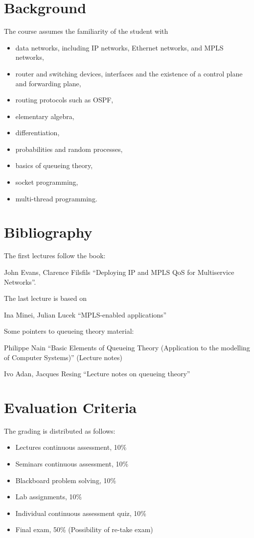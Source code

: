 \section{Background}
The course assumes the familiarity of the student with 
\begin{itemize}
\item data networks, including IP networks, Ethernet networks,  and MPLS networks,
\item router and switching devices, interfaces and the existence of a control plane and forwarding plane,
\item routing protocols such as OSPF,
\item elementary algebra,
\item differentiation,
\item probabilities and random processes, 
\item basics of queueing theory,
\item socket programming,
\item multi-thread programming.
\end{itemize}


\section{Bibliography}

The first lectures follow the book:

John Evans, Clarence Filsfils ``Deploying IP and MPLS QoS for Multiservice Networks''.

The last lecture is based on 

Ina Minei, Julian Lucek ``MPLS-enabled applications''

Some pointers to queueing theory material:

Philippe Nain ``Basic Elements of Queueing Theory (Application to the modelling of Computer Systems)'' (Lecture notes)


Ivo Adan, Jacques Resing ``Lecture notes on queueing theory''



\section{Evaluation Criteria}

The grading is distributed as follows:
\begin{itemize}
\item Lectures continuous assessment, 10\%
\item Seminars continuous assessment, 10\%
\item Blackboard problem solving, 10\%
\item Lab assignments, 10\%
\item Individual continuous assessment quiz, 10\%
\item Final exam, 50\% (Possibility of re-take exam)
\end{itemize}

